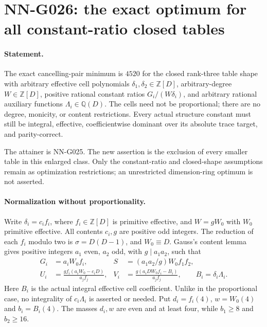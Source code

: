 \section{NN-G026: the exact optimum for all constant-ratio closed tables}
\paragraph{Statement.}
The exact cancelling-pair minimum is $4520$ for the closed
rank-three table shape with arbitrary effective cell polynomials
$\delta_1,\delta_2\in\mathbb Z[D]$, arbitrary-degree
$W\in\mathbb Z[D]$, positive rational constant ratios
$G_i/(W\delta_i)$, and arbitrary rational auxiliary functions
$\Lambda_i\in\mathbb Q(D)$. The cells need not be proportional;
there are no degree, monicity, or content restrictions.
Every actual structure constant must still be integral,
effective, coefficientwise dominant over its absolute trace
target, and parity-correct.

The attainer is NN-G025. The new assertion is the exclusion
of every smaller table in this enlarged class. Only the
constant-ratio and closed-shape assumptions remain as
optimization restrictions; an unrestricted dimension-ring
optimum is not asserted.

\paragraph{Normalization without proportionality.}
Write $\delta_i=c_i f_i$, where $f_i\in\mathbb Z[D]$
is primitive effective, and $W=gW_0$ with $W_0$ primitive
effective. All contents $c_i,g$ are positive odd integers.
The reduction of each $f_i$ modulo two is
$\sigma=D(D-1)$, and $W_0\equiv D$.
Gauss's content lemma gives positive integers $a_1$ even,
$a_2$ odd, with $g\mid a_1a_2$, such that
\[
 \begin{aligned}
 G_i&=a_iW_0f_i,&S&=(a_1a_2/g)W_0f_1f_2,\\
 U_i&=\frac{g f_i(a_iW_0-c_iD)}{a_j f_j},&
 V_i&=\frac{g(a_iDW_0f_i-B_i)}{a_j f_j},
 \qquad B_i=\delta_i\Lambda_i.
 \end{aligned}                                                       \tag{G026.1}
\]
Here $B_i$ is the actual integral effective cell coefficient.
Unlike in the proportional case, no integrality of
$c_i\Lambda_i$ is asserted or needed.
Put $d_i=f_i(4)$, $w=W_0(4)$ and $b_i=B_i(4)$.
The masses $d_i,w$ are even and at least four, while
$b_1\ge8$ and $b_2\ge16$.


